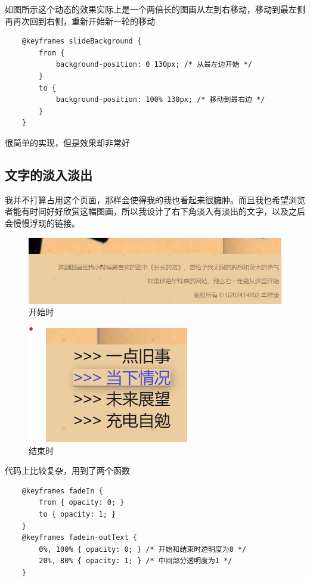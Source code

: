 \documentclass[supercite]{Experimental_Report}
\theoremstyle{definition}
\begin{document}
如图所示这个动态的效果实际上是一个两倍长的图画从左到右移动，移动到最左侧再再次回到右侧，重新开始新一轮的移动
\begin{verbatim}
	@keyframes slideBackground {
		from {
			background-position: 0 130px; /* 从最左边开始 */
		}
		to {
			background-position: 100% 130px; /* 移动到最右边 */
		}
	}
\end{verbatim}
很简单的实现，但是效果却非常好

\subsection{文字的淡入淡出}

我并不打算占用这个页面，那样会使得我的我也看起来很臃肿。而且我也希望浏览者能有时间好好欣赏这幅图画，所以我设计了右下角淡入有淡出的文字，以及之后会慢慢浮现的链接。
\begin{figure}[htb] %
	\begin{center}
		\includegraphics[scale=0.80]{images/zhuye-2.png}
		\caption{开始时}
		\label{fig2-3}
	\end{center}
\end{figure}

\begin{figure}[htb] %
	\begin{center}
		\includegraphics[scale=0.80]{images/zhuye-3.png}
		\caption{结束时}
		\label{fig2-4}
	\end{center}
\end{figure}


代码上比较复杂，用到了两个函数
\begin{verbatim}
	@keyframes fadeIn {
		from { opacity: 0; }
		to { opacity: 1; }
	}
	@keyframes fadein-outText {
		0%, 100% { opacity: 0; } /* 开始和结束时透明度为0 */
		20%, 80% { opacity: 1; } /* 中间部分透明度为1 */
	}
\end{verbatim}
\end{document}
